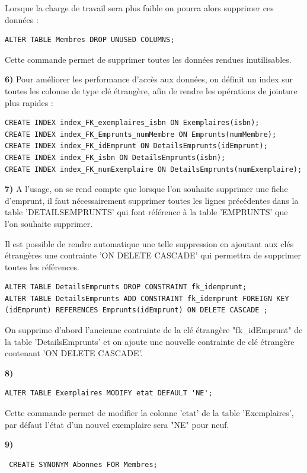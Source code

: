 \documentclass[a4paper,12pt]{article}
\begin{document}
Lorsque la charge de travail sera plus faible on pourra alors supprimer ces données : 
 \begin{lstlisting}
ALTER TABLE Membres DROP UNUSED COLUMNS;
\end{lstlisting}
Cette commande permet de supprimer toutes les données rendues inutilisables. 

\textbf {6) }
Pour améliorer les performance d'accès aux données, on définit un index sur toutes les colonne de type clé étrangère, afin de rendre les opérations de jointure plus rapides : 
 \begin{lstlisting}
CREATE INDEX index_FK_exemplaires_isbn ON Exemplaires(isbn);
CREATE INDEX index_FK_Emprunts_numMembre ON Emprunts(numMembre);
CREATE INDEX index_FK_idEmprunt ON DetailsEmprunts(idEmprunt);
CREATE INDEX index_FK_isbn ON DetailsEmprunts(isbn);
CREATE INDEX index_FK_numExemplaire ON DetailsEmprunts(numExemplaire);
\end{lstlisting}

\textbf {7) } A l’usage, on se rend compte que lorsque l’on souhaite supprimer une fiche d’emprunt, il faut nécessairement supprimer toutes les lignes précédentes dans la table 'DETAILSEMPRUNTS' qui font référence à la table 'EMPRUNTS' que l’on souhaite supprimer. 

Il est possible de rendre automatique une telle suppression en ajoutant aux clés étrangères une contrainte 'ON DELETE CASCADE' qui permettra de supprimer toutes les références. 
 \begin{lstlisting}
ALTER TABLE DetailsEmprunts DROP CONSTRAINT fk_idemprunt;
ALTER TABLE DetailsEmprunts ADD CONSTRAINT fk_idemprunt FOREIGN KEY (idEmprunt) REFERENCES Emprunts(idEmprunt) ON DELETE CASCADE ;
\end{lstlisting}

On supprime d'abord l'ancienne contrainte de la clé étrangère "fk\_idEmprunt" de la table 'DetailsEmprunts' et on ajoute une nouvelle contrainte de clé étrangère contenant 'ON DELETE CASCADE'. 

\textbf {8) }
\begin{lstlisting}
ALTER TABLE Exemplaires MODIFY etat DEFAULT 'NE';
\end{lstlisting}

Cette commande permet de modifier la colonne 'etat' de la table 'Exemplaires', par défaut l'état d'un nouvel exemplaire sera "NE" pour neuf. 

\textbf {9) }
 \begin{lstlisting}
 CREATE SYNONYM Abonnes FOR Membres;
 \end{lstlisting}
\end{document}
